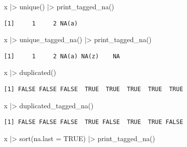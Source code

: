 \documentclass[
  letterpaper,
  DIV=11,
  numbers=noendperiod,
  oneside]{scrreprt}
\newenvironment{Shaded}{\begin{snugshade}}{\end{snugshade}}
\newcommand{\AttributeTok}[1]{\textcolor[rgb]{0.40,0.45,0.13}{#1}}
\newcommand{\ConstantTok}[1]{\textcolor[rgb]{0.56,0.35,0.01}{#1}}
\newcommand{\FunctionTok}[1]{\textcolor[rgb]{0.28,0.35,0.67}{#1}}
\newcommand{\NormalTok}[1]{\textcolor[rgb]{0.00,0.23,0.31}{#1}}
\newcommand{\SpecialCharTok}[1]{\textcolor[rgb]{0.37,0.37,0.37}{#1}}
\begin{document}
\begin{Shaded}
\begin{Highlighting}[]
\NormalTok{x }\SpecialCharTok{|\textgreater{}} 
  \FunctionTok{unique}\NormalTok{() }\SpecialCharTok{|\textgreater{}} 
  \FunctionTok{print\_tagged\_na}\NormalTok{()}
\end{Highlighting}
\end{Shaded}

\begin{verbatim}
[1]     1     2 NA(a)
\end{verbatim}

\begin{Shaded}
\begin{Highlighting}[]
\NormalTok{x }\SpecialCharTok{|\textgreater{}} 
  \FunctionTok{unique\_tagged\_na}\NormalTok{() }\SpecialCharTok{|\textgreater{}} 
  \FunctionTok{print\_tagged\_na}\NormalTok{()}
\end{Highlighting}
\end{Shaded}

\begin{verbatim}
[1]     1     2 NA(a) NA(z)    NA
\end{verbatim}

\begin{Shaded}
\begin{Highlighting}[]
\NormalTok{x }\SpecialCharTok{|\textgreater{}} 
  \FunctionTok{duplicated}\NormalTok{()}
\end{Highlighting}
\end{Shaded}

\begin{verbatim}
[1] FALSE FALSE FALSE  TRUE  TRUE  TRUE  TRUE  TRUE
\end{verbatim}

\begin{Shaded}
\begin{Highlighting}[]
\NormalTok{x }\SpecialCharTok{|\textgreater{}} 
  \FunctionTok{duplicated\_tagged\_na}\NormalTok{()}
\end{Highlighting}
\end{Shaded}

\begin{verbatim}
[1] FALSE FALSE FALSE  TRUE FALSE  TRUE  TRUE FALSE
\end{verbatim}

\begin{Shaded}
\begin{Highlighting}[]
\NormalTok{x }\SpecialCharTok{|\textgreater{}} 
  \FunctionTok{sort}\NormalTok{(}\AttributeTok{na.last =} \ConstantTok{TRUE}\NormalTok{) }\SpecialCharTok{|\textgreater{}} 
  \FunctionTok{print\_tagged\_na}\NormalTok{()}
\end{Highlighting}
\end{Shaded}
\end{document}
